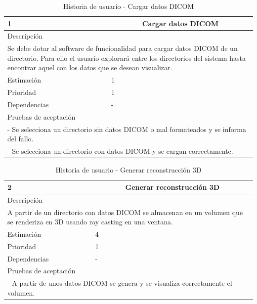 \begin{table}[H]
	\begin{center}
		\begin{tabular} {|l|c|l|}
			\hline
			1 & \multicolumn{2}{c|}{Cargar datos DICOM} \\ \hline \hline
			\multicolumn{3}{|l|}{Descripción} \\ \hline
			\multicolumn{3}{|p{12cm}|}{Se debe dotar al software de funcionalidad para cargar datos DICOM de un directorio. Para ello el usuario explorará entre los directorios del sistema hasta encontrar aquel con los datos que se desean visualizar.} \\ \hline
			\multicolumn{2}{|l|}{Estimación} & 1 \\ \hline
			\multicolumn{2}{|l|}{Prioridad} & 1 \\ \hline
			\multicolumn{2}{|l|}{Dependencias} & - \\ \hline
			\multicolumn{3}{|l|}{Pruebas de aceptación} \\ \hline
			\multicolumn{3}{|p{12cm}|}{ - Se selecciona un directorio sin datos DICOM o mal formateados y se informa del fallo.} \\ 
			\multicolumn{3}{|p{12cm}|}{ - Se selecciona un directorio con datos DICOM y se cargan correctamente.} \\ \hline
		\end{tabular}
	\end{center}
	\caption{Historia de usuario - Cargar datos DICOM}
	\label{tab:hu_cargar_datos_dicom}
\end{table}

\begin{table}[H]
	\begin{center}
		\begin{tabular} {|l|c|l|}
			\hline
			2 & \multicolumn{2}{c|}{Generar reconstrucción 3D} \\ \hline \hline
			\multicolumn{3}{|l|}{Descripción} \\ \hline
			\multicolumn{3}{|p{12cm}|}{A partir de un directorio con datos DICOM se almacenan en un volumen que se renderiza en 3D usando ray casting en una ventana.} \\ \hline
			\multicolumn{2}{|l|}{Estimación} & 4 \\ \hline
			\multicolumn{2}{|l|}{Prioridad} & 1 \\ \hline
			\multicolumn{2}{|l|}{Dependencias} & - \\ \hline
			\multicolumn{3}{|l|}{Pruebas de aceptación} \\ \hline
			\multicolumn{3}{|p{12cm}|}{ - A partir de unos datos DICOM se genera y se visualiza correctamente el volumen.} \\ \hline
		\end{tabular}
	\end{center}
	\caption{Historia de usuario - Generar reconstrucción 3D}
	\label{tab:hu_generar_reconstruccion_3d}
\end{table}

